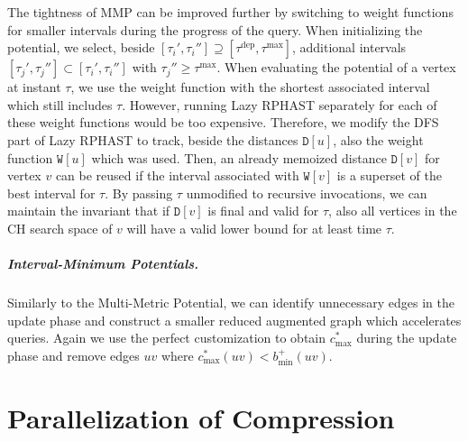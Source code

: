 \documentclass[a4paper,UKenglish,cleveref, autoref, thm-restate,anonymous]{lipics-v2021}
\newcommand*{\comb}{c}
\newcommand*{\tdep}{\tau^{\operatorname{dep}}}
\newcommand*{\tmax}{\tau^{\max}}
\begin{document}
The tightness of MMP can be improved further by switching to weight functions for smaller intervals during the progress of the query.
When initializing the potential, we select, beside $[\tau_i', \tau_i''] \supseteq [\tdep,\tmax]$, additional intervals $[\tau_j', \tau_j''] \subset [\tau_i', \tau_i'']$ with $\tau_j'' \geq \tmax$.
When evaluating the potential of a vertex at instant $\tau$, we use the weight function with the shortest associated interval which still includes $\tau$.
However, running Lazy RPHAST separately for each of these weight functions would be too expensive.
Therefore, we modify the DFS part of Lazy RPHAST to track, beside the distances $\mathtt{D}[u]$, also the weight function $\mathtt{W}[u]$ which was used.
Then, an already memoized distance $\mathtt{D}[v]$ for vertex $v$ can be reused if the interval associated with $\mathtt{W}[v]$ is a superset of the best interval for $\tau$.
By passing $\tau$ unmodified to recursive invocations, we can maintain the invariant that if $\mathtt{D}[v]$ is final and valid for $\tau$, also all vertices in the CH search space of $v$ will have a valid lower bound for at least time $\tau$.

\subparagraph{Interval-Minimum Potentials.}
Similarly to the Multi-Metric Potential, we can identify unnecessary edges in the update phase and construct a smaller reduced augmented graph which accelerates queries.
Again we use the perfect customization to obtain $\comb^*_{\max}$ during the update phase and remove edges $uv$ where $\comb^*_{\max}(uv) < b^+_{\min}(uv)$.%

\section{Parallelization of Compression}\label{sec:appendix:parallelization}



\end{document}
